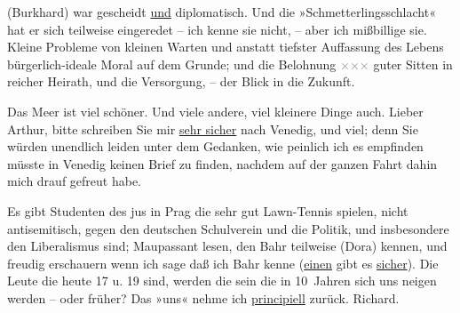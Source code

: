                   (Burkhard) war gescheidt \uline{und} diplomatisch. Und die »Schmetterlingsschlacht« hat er sich teilweise eingeredet – ich
               kenne sie nicht, – aber ich mißbillige sie. Kleine Probleme von kleinen Warten und anstatt
               tiefster Auffassung des {\pb}Lebens
               bürgerlich-ideale Moral auf dem Grunde; und die Belohnung \textcolor{gray}{×}\-\textcolor{gray}{×}\-\textcolor{gray}{×} guter Sitten in reicher Heirath, und die
               Versorgung, – der Blick in die Zukunft.\pend
           
\pstart
           Das Meer ist viel schöner. Und viele andere, viel kleinere Dinge auch. Lieber Arthur,
               bitte schreiben Sie mir \uline{sehr sicher} nach Venedig, und viel; denn Sie würden unendlich
               leiden unter dem Gedanken, wie peinlich ich es empfinden müsste in Venedig keinen Brief {\pb}zu finden, nachdem auf der ganzen
               Fahrt dahin mich drauf gefreut habe.\pend
           
\pstart
           Es gibt Studenten des jus in Prag die sehr gut
               Lawn-Tennis spielen, nicht antisemitisch, gegen den deutschen Schulverein und die Politik, und insbesondere den Liberalismus
               sind; Maupassant lesen, den Bahr teilweise (Dora) kennen, und freudig erschauern wenn ich sage daß ich Bahr kenne (\uline{einen} gibt es \uline{sicher}). Die Leute die heute
               17 u. 19 sind, werden die sein die in 10 Jahren sich uns neigen werden – oder früher?
               Das »uns« nehme ich \uline{principiell} zurück.
                  \spacefill\mbox{Richard.}\pend
           \endnumbering{}  \newcommand{\dateiname}{L00388}\newcommand{\titel}{Richard Beer-Hofmann an Arthur Schnitzler, 20. 10. 1894}\newcommand{\editorInnen}{Herausgegeben von Martin Anton Müller}
